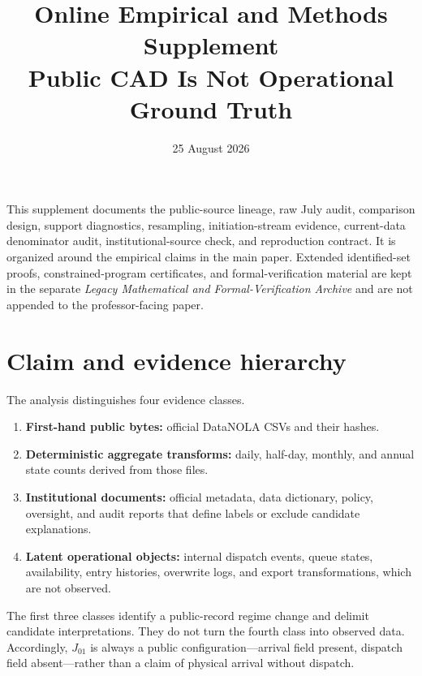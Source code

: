 \documentclass[11pt]{article}
\title{\vspace{-1.6em}\textbf{Online Empirical and Methods Supplement}\\[0.35em]
\large Public CAD Is Not Operational Ground Truth}
\author{}
\date{25 August 2026}
\begin{document}
\maketitle
\thispagestyle{plain}
\vspace{-1.2em}

\begin{plainbox}[title=Scope]
This supplement documents the public-source lineage, raw July audit, comparison design, support diagnostics, resampling, initiation-stream evidence, current-data denominator audit, institutional-source check, and reproduction contract. It is organized around the empirical claims in the main paper. Extended identified-set proofs, constrained-program certificates, and formal-verification material are kept in the separate \emph{Legacy Mathematical and Formal-Verification Archive} and are not appended to the professor-facing paper.
\end{plainbox}

\setcounter{tocdepth}{1}
\begingroup
\small
\tableofcontents
\endgroup
\newpage

\section{Claim and evidence hierarchy}

The analysis distinguishes four evidence classes.
\begin{enumerate}
\item \textbf{First-hand public bytes:} official DataNOLA CSVs and their hashes.
\item \textbf{Deterministic aggregate transforms:} daily, half-day, monthly, and annual state counts derived from those files.
\item \textbf{Institutional documents:} official metadata, data dictionary, policy, oversight, and audit reports that define labels or exclude candidate explanations.
\item \textbf{Latent operational objects:} internal dispatch events, queue states, availability, entry histories, overwrite logs, and export transformations, which are not observed.
\end{enumerate}

The first three classes identify a public-record regime change and delimit candidate interpretations. They do not turn the fourth class into observed data. Accordingly, $J_{01}$ is always a public configuration---arrival field present, dispatch field absent---rather than a claim of physical arrival without dispatch.
\end{document}
